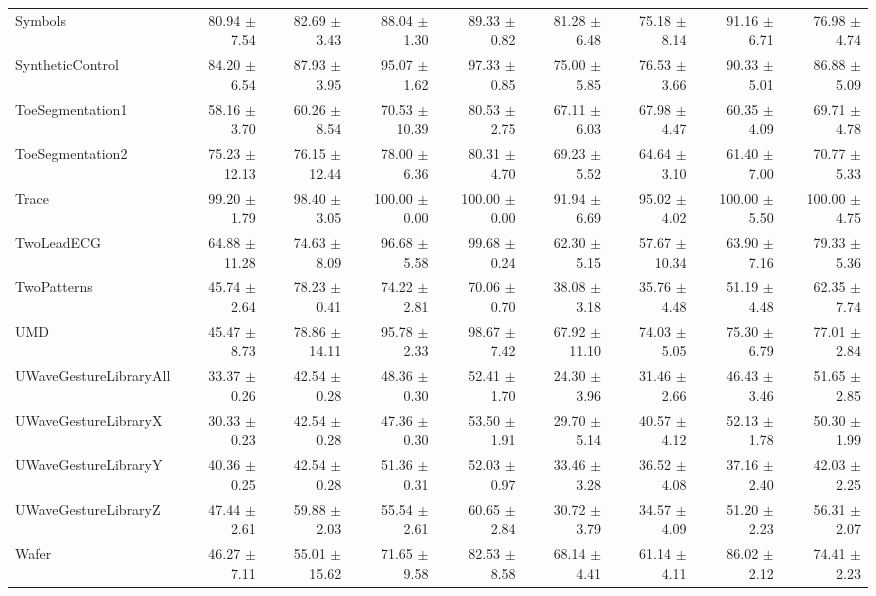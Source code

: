 \begin{landscape}
\begin{longtable}{lrrrrrrrr}
Symbols & 80.94 $\pm$ 7.54 & 82.69 $\pm$ 3.43 & 88.04 $\pm$ 1.30 & 89.33 $\pm$ 0.82 & 81.28 $\pm$ 6.48 & 75.18 $\pm$ 8.14 & 91.16 $\pm$ 6.71 & 76.98 $\pm$ 4.74 \\
SyntheticControl & 84.20 $\pm$ 6.54 & 87.93 $\pm$ 3.95 & 95.07 $\pm$ 1.62 & 97.33 $\pm$ 0.85 & 75.00 $\pm$ 5.85 & 76.53 $\pm$ 3.66 & 90.33 $\pm$ 5.01 & 86.88 $\pm$ 5.09 \\
ToeSegmentation1 & 58.16 $\pm$ 3.70 & 60.26 $\pm$ 8.54 & 70.53 $\pm$ 10.39 & 80.53 $\pm$ 2.75 & 67.11 $\pm$ 6.03 & 67.98 $\pm$ 4.47 & 60.35 $\pm$ 4.09 & 69.71 $\pm$ 4.78 \\
ToeSegmentation2 & 75.23 $\pm$ 12.13 & 76.15 $\pm$ 12.44 & 78.00 $\pm$ 6.36 & 80.31 $\pm$ 4.70 & 69.23 $\pm$ 5.52 & 64.64 $\pm$ 3.10 & 61.40 $\pm$ 7.00 & 70.77 $\pm$ 5.33 \\
Trace & 99.20 $\pm$ 1.79 & 98.40 $\pm$ 3.05 & 100.00 $\pm$ 0.00 & 100.00 $\pm$ 0.00 & 91.94 $\pm$ 6.69 & 95.02 $\pm$ 4.02 & 100.00 $\pm$ 5.50 & 100.00 $\pm$ 4.75 \\
TwoLeadECG & 64.88 $\pm$ 11.28 & 74.63 $\pm$ 8.09 & 96.68 $\pm$ 5.58 & 99.68 $\pm$ 0.24 & 62.30 $\pm$ 5.15 & 57.67 $\pm$ 10.34 & 63.90 $\pm$ 7.16 & 79.33 $\pm$ 5.36 \\
TwoPatterns & 45.74 $\pm$ 2.64 & 78.23 $\pm$ 0.41 & 74.22 $\pm$ 2.81 & 70.06 $\pm$ 0.70 & 38.08 $\pm$ 3.18 & 35.76 $\pm$ 4.48 & 51.19 $\pm$ 4.48 & 62.35 $\pm$ 7.74 \\
UMD & 45.47 $\pm$ 8.73 & 78.86 $\pm$ 14.11 & 95.78 $\pm$ 2.33 & 98.67 $\pm$ 7.42 & 67.92 $\pm$ 11.10 & 74.03 $\pm$ 5.05 & 75.30 $\pm$ 6.79 & 77.01 $\pm$ 2.84 \\
UWaveGestureLibraryAll & 33.37 $\pm$ 0.26 & 42.54 $\pm$ 0.28 & 48.36 $\pm$ 0.30 & 52.41 $\pm$ 1.70 & 24.30 $\pm$ 3.96 & 31.46 $\pm$ 2.66 & 46.43 $\pm$ 3.46 & 51.65 $\pm$ 2.85 \\
UWaveGestureLibraryX & 30.33 $\pm$ 0.23 & 42.54 $\pm$ 0.28 & 47.36 $\pm$ 0.30 & 53.50 $\pm$ 1.91 & 29.70 $\pm$ 5.14 & 40.57 $\pm$ 4.12 & 52.13 $\pm$ 1.78 & 50.30 $\pm$ 1.99 \\
UWaveGestureLibraryY & 40.36 $\pm$ 0.25 & 42.54 $\pm$ 0.28 & 51.36 $\pm$ 0.31 & 52.03 $\pm$ 0.97 & 33.46 $\pm$ 3.28 & 36.52 $\pm$ 4.08 & 37.16 $\pm$ 2.40 & 42.03 $\pm$ 2.25 \\
UWaveGestureLibraryZ & 47.44 $\pm$ 2.61 & 59.88 $\pm$ 2.03 & 55.54 $\pm$ 2.61 & 60.65 $\pm$ 2.84 & 30.72 $\pm$ 3.79 & 34.57 $\pm$ 4.09 & 51.20 $\pm$ 2.23 & 56.31 $\pm$ 2.07 \\
Wafer & 46.27 $\pm$ 7.11 & 55.01 $\pm$ 15.62 & 71.65 $\pm$ 9.58 & 82.53 $\pm$ 8.58 & 68.14 $\pm$ 4.41 & 61.14 $\pm$ 4.11 & 86.02 $\pm$ 2.12 & 74.41 $\pm$ 2.23 \\

\end{longtable}
\end{landscape}
